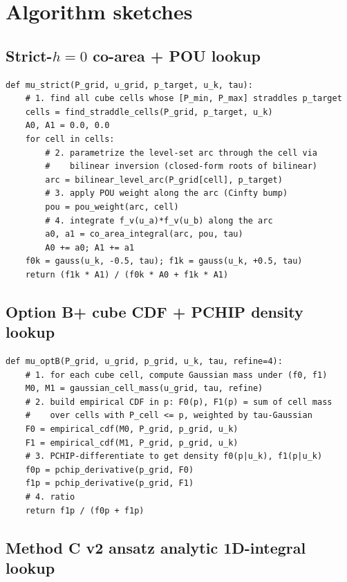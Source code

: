 \documentclass[11pt]{article}
\begin{document}
\section{Algorithm sketches}

\subsection{Strict-$h{=}0$ co-area + POU lookup}

\begin{verbatim}
def mu_strict(P_grid, u_grid, p_target, u_k, tau):
    # 1. find all cube cells whose [P_min, P_max] straddles p_target
    cells = find_straddle_cells(P_grid, p_target, u_k)
    A0, A1 = 0.0, 0.0
    for cell in cells:
        # 2. parametrize the level-set arc through the cell via
        #    bilinear inversion (closed-form roots of bilinear)
        arc = bilinear_level_arc(P_grid[cell], p_target)
        # 3. apply POU weight along the arc (Cinfty bump)
        pou = pou_weight(arc, cell)
        # 4. integrate f_v(u_a)*f_v(u_b) along the arc
        a0, a1 = co_area_integral(arc, pou, tau)
        A0 += a0; A1 += a1
    f0k = gauss(u_k, -0.5, tau); f1k = gauss(u_k, +0.5, tau)
    return (f1k * A1) / (f0k * A0 + f1k * A1)
\end{verbatim}

\subsection{Option B+ cube CDF + PCHIP density lookup}

\begin{verbatim}
def mu_optB(P_grid, u_grid, p_grid, u_k, tau, refine=4):
    # 1. for each cube cell, compute Gaussian mass under (f0, f1)
    M0, M1 = gaussian_cell_mass(u_grid, tau, refine)
    # 2. build empirical CDF in p: F0(p), F1(p) = sum of cell mass
    #    over cells with P_cell <= p, weighted by tau-Gaussian
    F0 = empirical_cdf(M0, P_grid, p_grid, u_k)
    F1 = empirical_cdf(M1, P_grid, p_grid, u_k)
    # 3. PCHIP-differentiate to get density f0(p|u_k), f1(p|u_k)
    f0p = pchip_derivative(p_grid, F0)
    f1p = pchip_derivative(p_grid, F1)
    # 4. ratio
    return f1p / (f0p + f1p)
\end{verbatim}

\subsection{Method C v2 ansatz analytic 1D-integral lookup}
\end{document}
